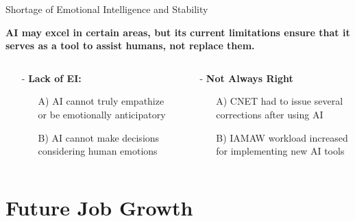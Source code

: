 \documentclass{beamer}
\begin{document}
    \begin{frame}[fragile]{Shortage of Emotional Intelligence and Stability} 
        \begin{center}
            \textbf{\Large AI may excel in certain areas, 
            but its current limitations ensure that it serves
             as a tool to \textcolor{structure}{assist humans, not replace them.}}
        \end{center}
        \begin{columns}
        \begin{column}{0.5\textwidth}
            \begin{enumerate}
                \item[-] \textbf{\textcolor{structure}{\large Lack of EI:}}\newline
                \begin{enumerate}
                    \item[A)] AI cannot truly empathize or be emotionally anticipatory
                    \item[B)] AI cannot make decisions considering human emotions
                \end{enumerate} 
            \end{enumerate}
        \end{column}
        \begin{column}{0.5\textwidth}
        \begin{enumerate}
            \item[-] \textbf{\textcolor{structure}{\large Not Always Right}}\newline 
            \begin{enumerate}
                \item[A)] CNET had to issue several corrections after using AI 
                \item[B)] IAMAW  workload increased
                for implementing new AI tools
            \end{enumerate}
        \end{enumerate}
        \end{column}
        \end{columns}
    \end{frame}
    \section{Future Job Growth}
\end{document}

